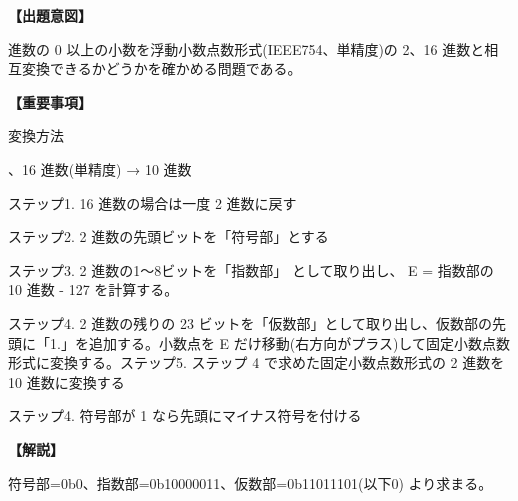 \noindent \textbf{【出題意図】}

 進数の 0 以上の小数を浮動小数点数形式(IEEE754、単精度)の 2、16 進数と相互変換できるかどうかを確かめる問題である。

\vspace{1em}
\noindent \textbf{【重要事項】}

\noindent 変換方法

\medskip
{}、16 進数(単精度) → 10 進数

\noindent ステップ1.  16 進数の場合は一度 2 進数に戻す

\noindent ステップ2.  2 進数の先頭ビットを「符号部」とする

\noindent ステップ3.  2 進数の1〜8ビットを「指数部」 として取り出し、 E = 指数部の 10 進数 - 127 を計算する。

\noindent ステップ4.  2 進数の残りの 23 ビットを「仮数部」として取り出し、仮数部の先頭に「1.」を追加する。小数点を E だけ移動(右方向がプラス)して固定小数点数形式に変換する。ステップ5.  ステップ 4 で求めた固定小数点数形式の 2 進数を 10 進数に変換する

\noindent ステップ4.  符号部が 1 なら先頭にマイナス符号を付ける 


\vspace{1em}
\noindent \textbf{【解説】}

\noindent 符号部=0b0、指数部=0b10000011、仮数部=0b11011101(以下0) より求まる。
